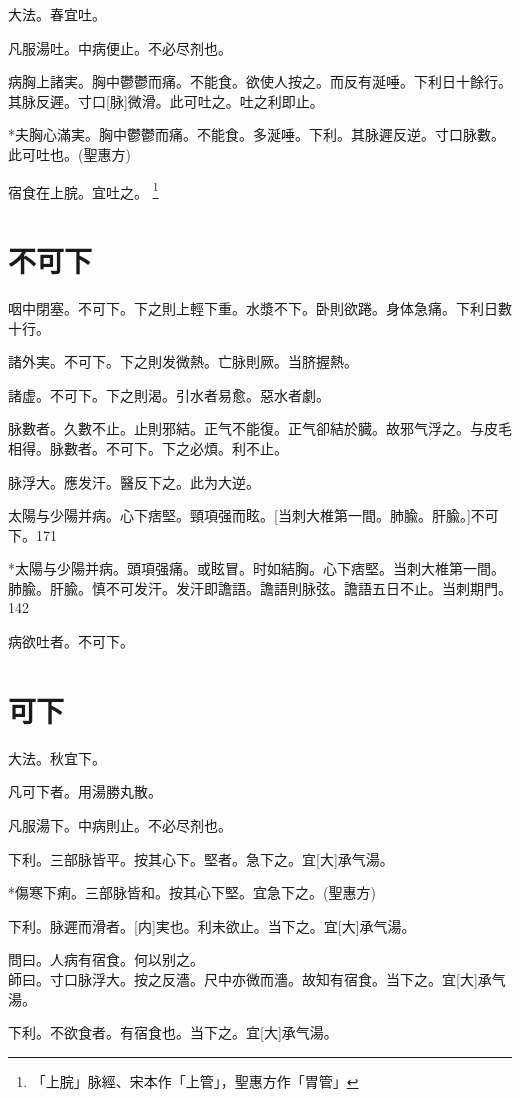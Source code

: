 \documentclass[12pt,oneside,UTF8,b5paper]{ctexbook}她她她她她她她
\begin{document}
大法。春宜吐。

凡服湯吐。中病便止。不必尽剂也。

病胸上諸実。胸中鬱鬱而痛。不能食。欲使人按之。而反有涎唾。下利日十餘行。其脉反遲。寸口[脉]微滑。此可吐之。吐之利即止。

*夫胸心滿実。胸中鬱鬱而痛。不能食。多涎唾。下利。其脉遲反逆。寸口脉數。此可吐也。(聖惠方)

宿食在上脘。宜吐之。
	\footnote{「上脘」脉經、宋本作「上管」，聖惠方作「胃管」}

\chapter{不可下}

咽中閉塞。不可下。下之則上輕下重。水漿不下。卧則欲踡。身体急痛。下利日數十行。

諸外実。不可下。下之則发微熱。亡脉則厥。当脐握熱。

諸虚。不可下。下之則渴。引水者易愈。惡水者劇。

脉數者。久數不止。止則邪結。正气不能復。正气卻結於臓。故邪气浮之。与皮毛相得。脉數者。不可下。下之必煩。利不止。

脉浮大。應发汗。醫反下之。此为大逆。

太陽与少陽并病。心下痞堅。頸項强而眩。[当刺大椎第一間。肺腧。肝腧。]不可下。171

*太陽与少陽并病。頭項强痛。或眩冒。时如結胸。心下痞堅。当刺大椎第一間。肺腧。肝腧。慎不可发汗。发汗即譫語。譫語則脉弦。譫語五日不止。当刺期門。142

病欲吐者。不可下。

\chapter{可下}

大法。秋宜下。

凡可下者。用湯勝丸散。

凡服湯下。中病則止。不必尽剂也。

下利。三部脉皆平。按其心下。堅者。急下之。宜[大]承气湯。

*傷寒下痢。三部脉皆和。按其心下堅。宜急下之。(聖惠方)

下利。脉遲而滑者。[内]実也。利未欲止。当下之。宜[大]承气湯。

問曰。人病有宿食。何以别之。\\
師曰。寸口脉浮大。按之反濇。尺中亦微而濇。故知有宿食。当下之。宜[大]承气湯。

下利。不欲食者。有宿食也。当下之。宜[大]承气湯。
\end{document}
